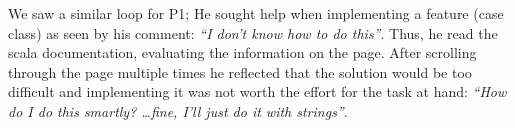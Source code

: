 




We saw a similar loop for P1; He sought help when implementing a feature (case class) as seen by his comment: \emph{``I don't know how to do this''}. Thus, he read the scala documentation, evaluating the information on the page. After scrolling through the page multiple times he reflected that the solution would be too difficult and   implementing it was not worth the effort for the task at hand: \emph{``How do I do this smartly? \ldots fine, I'll just do it with strings''}.


